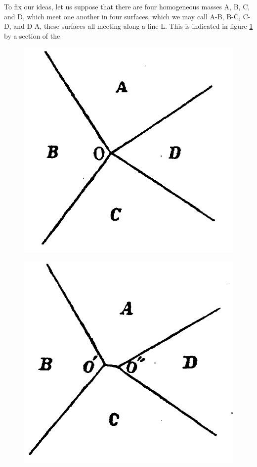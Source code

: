 \documentclass[12pt]{article}
\begin{document}
To fix our ideas, let us suppose that there are four homogeneous masses A, B, C, and D, which meet one another in four surfaces, which we may call A-B, B-C, C-D, and D-A, these surfaces all meeting along a line L. This is indicated in figure \ref{fig_11} by a section of the
\begin{figure}
\centering
\begin{minipage}{.3\textwidth}
  \centering
  \includegraphics[width=\linewidth]{fig_11}
  \label{fig_11}
\end{minipage}%
\begin{minipage}{.3\textwidth}
  \centering
  \includegraphics[width=\linewidth]{fig_12}

\end{minipage}
\end{figure}
\end{document}
